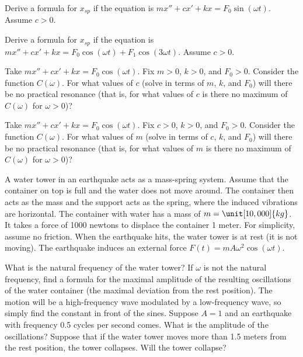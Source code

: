 \begin{exercise}
Derive a formula for $x_{sp}$ if the equation is
$m x'' + c x' + kx = F_0 \sin (\omega t)$.  Assume $c > 0$.
\end{exercise}

\begin{exercise}
Derive a formula for $x_{sp}$ if the equation is
$m x'' + c x' + kx = F_0 \cos (\omega t) + F_1 \cos (3\omega t)$.
Assume $c > 0$.
\end{exercise}

\begin{exercise}
Take $m x'' + c x' + kx = F_0 \cos (\omega t)$.
Fix $m > 0$, $k > 0$, and $F_0 > 0$.  Consider the function $C(\omega)$.
For what values of $c$ (solve in terms of $m$, $k$, and $F_0$) will there be no
practical resonance (that is, for what values of $c$ is there no maximum of
$C(\omega)$ for $\omega > 0$)?
\end{exercise}

\begin{exercise}
Take $m x'' + c x' + kx = F_0 \cos (\omega t)$.
Fix $c > 0$, $k > 0$, and $F_0 > 0$.  Consider the function $C(\omega)$.
For what values of $m$ (solve in terms of $c$, $k$, and $F_0$) will there be no
practical resonance (that is, for what values of $m$ is there no maximum of
$C(\omega)$ for $\omega > 0$)?
\end{exercise}

\begin{exercise}
\pagebreak[3]
A water tower in an earthquake acts as a mass-spring system.
Assume that the container on top is full and the water does not move around.
The container then acts as the mass and the support acts as the spring, where
the induced vibrations are horizontal.  The container with water
has a mass of $m=\unit[10,000]{kg}$.  It takes a force of 1000 newtons
to displace the container 1 meter.  For simplicity, assume no friction.
When the earthquake hits, the water tower is at rest (it is not moving).
%
The earthquake induces an external force 
$F(t) = m A \omega^2 \cos (\omega t)$.
\begin{tasks}
\task
What is the natural frequency of the water tower?
\task
If $\omega$ is not the natural frequency, find a formula for the maximal
amplitude of the resulting oscillations of the water container (the maximal
deviation from the rest position).  The motion will be a high-frequency wave
modulated by a low-frequency wave, so simply find the constant in front of the
sines.
\task
Suppose $A = 1$ and an earthquake with frequency 0.5 cycles per second
comes.  What is the amplitude of the oscillations?  Suppose that if the water
tower moves more than 1.5 meters from the rest position, the tower collapses.
Will the tower collapse?
\end{tasks}
\end{exercise}


